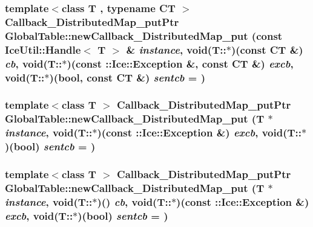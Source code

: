 \label{namespace_global_table_a1b764a4b02bf17c9bc7c012febad04db}
\hypertarget{namespace_global_table_a4392d24e7552100c5e4aa1aa033b28f7}{
\subsubsection[{newCallback\_\-DistributedMap\_\-put}]{\setlength{\rightskip}{0pt plus 5cm}template$<$class T , typename CT $>$ {\bf Callback\_\-DistributedMap\_\-putPtr} GlobalTable::newCallback\_\-DistributedMap\_\-put (const IceUtil::Handle$<$ T $>$ \& {\em instance}, \/  void(T::$\ast$)(const CT \&) {\em cb}, \/  void(T::$\ast$)(const ::Ice::Exception \&, const CT \&) {\em excb}, \/  void(T::$\ast$)(bool, const CT \&) {\em sentcb} = {})}}
\label{namespace_global_table_a4392d24e7552100c5e4aa1aa033b28f7}
\hypertarget{namespace_global_table_ad3de1cea0da2fb9dfb7e2afbbc8577ca}{
\subsubsection[{newCallback\_\-DistributedMap\_\-put}]{\setlength{\rightskip}{0pt plus 5cm}template$<$class T $>$ {\bf Callback\_\-DistributedMap\_\-putPtr} GlobalTable::newCallback\_\-DistributedMap\_\-put (T $\ast$ {\em instance}, \/  void(T::$\ast$)(const ::Ice::Exception \&) {\em excb}, \/  void(T::$\ast$)(bool) {\em sentcb} = {})}}
\label{namespace_global_table_ad3de1cea0da2fb9dfb7e2afbbc8577ca}
\hypertarget{namespace_global_table_a1b1c1f4989bc137512559b0b2e6fb98f}{
\subsubsection[{newCallback\_\-DistributedMap\_\-put}]{\setlength{\rightskip}{0pt plus 5cm}template$<$class T $>$ {\bf Callback\_\-DistributedMap\_\-putPtr} GlobalTable::newCallback\_\-DistributedMap\_\-put (T $\ast$ {\em instance}, \/  void(T::$\ast$)() {\em cb}, \/  void(T::$\ast$)(const ::Ice::Exception \&) {\em excb}, \/  void(T::$\ast$)(bool) {\em sentcb} = {})}}
